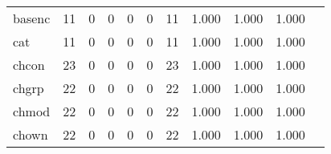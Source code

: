 \begin{longtable}{lp{1.2cm}p{1.2cm}p{1.2cm}p{1.2cm}p{1.2cm}p{1.2cm}p{1.2cm}p{1.2cm}p{1.2cm}p{1.2cm}}
basenc    &                                    11 &                                                  0 &                                                  0 &                                                  0 &                                                  0 &                                                 11 &                                              1.000 &                                              1.000 &                                              1.000 \\
cat       &                                    11 &                                                  0 &                                                  0 &                                                  0 &                                                  0 &                                                 11 &                                              1.000 &                                              1.000 &                                              1.000 \\
chcon     &                                    23 &                                                  0 &                                                  0 &                                                  0 &                                                  0 &                                                 23 &                                              1.000 &                                              1.000 &                                              1.000 \\
chgrp     &                                    22 &                                                  0 &                                                  0 &                                                  0 &                                                  0 &                                                 22 &                                              1.000 &                                              1.000 &                                              1.000 \\
chmod     &                                    22 &                                                  0 &                                                  0 &                                                  0 &                                                  0 &                                                 22 &                                              1.000 &                                              1.000 &                                              1.000 \\
chown     &                                    22 &                                                  0 &                                                  0 &                                                  0 &                                                  0 &                                                 22 &                                              1.000 &                                              1.000 &                                              1.000 \\

\end{longtable}
